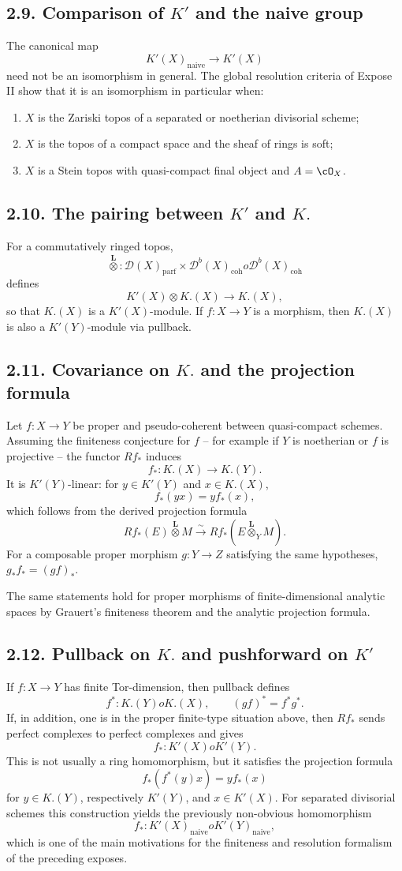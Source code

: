 \documentclass[11pt]{article}
\theoremstyle{plain}
\theoremstyle{definition}
\theoremstyle{remark}
\newcommand{\D}{\mathcal D}\newcommand{\E}{\mathcal E}\newcommand{\F}{\mathcal F}
\providecommand{\iso}{\xrightarrow{\sim}}
\providecommand{\Ltens}{\overset{\mathbf L}{\otimes}}
\begin{document}
\subsection*{2.9. Comparison of $K'$ and the naive group}
The canonical map
\[
K'(X)_{\mathrm{naive}}\to K'(X)
\]
need not be an isomorphism in general. The global resolution criteria of Expose II show that it is an isomorphism in particular when:
\begin{enumerate}[label=(\roman*)]
\item $X$ is the Zariski topos of a separated or noetherian divisorial scheme;
\item $X$ is the topos of a compact space and the sheaf of rings is soft;
\item $X$ is a Stein topos with quasi-compact final object and $A=\cO_X$.
\end{enumerate}

\subsection*{2.10. The pairing between $K'$ and $K.$}
For a commutatively ringed topos,
\[
\Ltens: \D(X)_{\mathrm{parf}}\times\D^b(X)_{\mathrm{coh}}	o\D^b(X)_{\mathrm{coh}}
\]
defines
\[
K'(X)\otimes K.(X)\to K.(X),
\]
so that $K.(X)$ is a $K'(X)$-module. If $f:X\to Y$ is a morphism, then $K.(X)$ is also a $K'(Y)$-module via pullback.

\subsection*{2.11. Covariance on $K.$ and the projection formula}
Let $f:X\to Y$ be proper and pseudo-coherent between quasi-compact schemes. Assuming the finiteness conjecture for $f$ -- for example if $Y$ is noetherian or $f$ is projective -- the functor $Rf_*$ induces
\[
f_*:K.(X)\to K.(Y).
\]
It is $K'(Y)$-linear: for $y\in K'(Y)$ and $x\in K.(X)$,
\[
f_*(yx)=y f_*(x),
\]
which follows from the derived projection formula
\[
Rf_*(E)\Ltens M\iso Rf_*(E\Ltens_Y M).
\]
For a composable proper morphism $g:Y\to Z$ satisfying the same hypotheses, $g_*f_*=(gf)_*$.

The same statements hold for proper morphisms of finite-dimensional analytic spaces by Grauert's finiteness theorem and the analytic projection formula.

\subsection*{2.12. Pullback on $K.$ and pushforward on $K'$}
If $f:X\to Y$ has finite Tor-dimension, then pullback defines
\[
f^*:K.(Y)	o K.(X),
\qquad
(gf)^*=f^*g^*.
\]
If, in addition, one is in the proper finite-type situation above, then $Rf_*$ sends perfect complexes to perfect complexes and gives
\[
f_*:K'(X)	o K'(Y).
\]
This is not usually a ring homomorphism, but it satisfies the projection formula
\[
f_*(f^*(y)x)=y f_*(x)
\]
for $y\in K.(Y)$, respectively $K'(Y)$, and $x\in K'(X)$. For separated divisorial schemes this construction yields the previously non-obvious homomorphism
\[
f_*:K'(X)_{\mathrm{naive}}	o K'(Y)_{\mathrm{naive}},
\]
which is one of the main motivations for the finiteness and resolution formalism of the preceding exposes.
\end{document}
